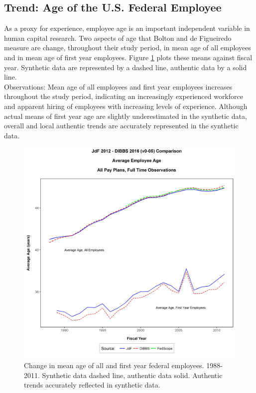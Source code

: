 \documentclass[10pt, letterpaper]{article}
\begin{document}
\begin{spacing}{1.0}
\clearpage

\subsection{Trend:  Age of the U.S. Federal Employee}

As a proxy for experience, employee age is an important independent variable in human capital research.  Two aspects of age that Bolton and de Figueiredo measure are change, throughout their study period, in mean age of all employees and in mean age of first year employees.  Figure \ref{figure:AgeVsFYAllPayPlans} plots these means against fiscal year.   Synthetic data are represented by a dashed line, authentic data by a solid line.\\

Observations:  Mean age of all employees and first year employees increases throughout the study period, indicating an increasingly experienced workforce and apparent hiring of employees with increasing levels of experience.  Although actual means of first year age are slightly underestimated in the synthetic data, overall and local authentic trends are accurately represented in the synthetic data.\\

\vspace{20pt}

\begin{figure}[h]
    \centering
    \includegraphics[width=6in, trim={0 0.6in 0 1in}, clip]{AgeVsFYAllPayPlans.png}
    \caption{Change in mean age of all and first year federal employees.  1988-2011.  Synthetic data dashed line, authentic data solid.  Authentic trends accurately reflected in synthetic data.}
    \label{figure:AgeVsFYAllPayPlans}
\end{figure}


\end{spacing}
\end{document}
